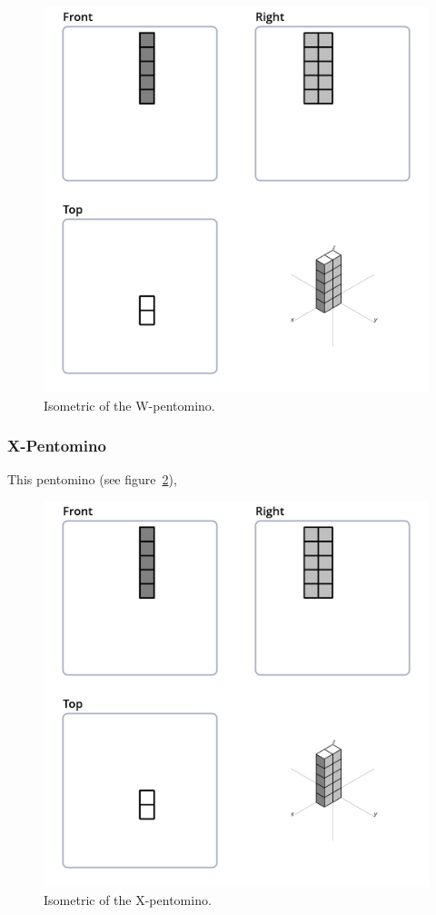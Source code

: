 \begin{figure}
	\centering
	\includegraphics[scale=0.3]{iso_diagrams/o.png}
	\caption{Isometric of the W-pentomino.}
  \label{fig:iso-pent-w}
\end{figure}
\subsubsection{X-Pentomino}
\label{sec:x-pentomino}
This pentomino (see figure~\ref{fig:iso-pent-x}),


\begin{figure}
	\centering
	\includegraphics[scale=0.3]{iso_diagrams/o.png}
	\caption{Isometric of the X-pentomino.}
  \label{fig:iso-pent-x}
\end{figure}
